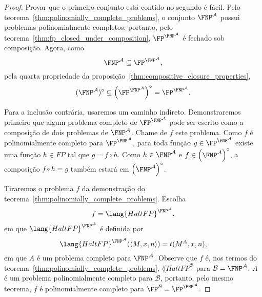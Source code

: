 \begin{proof}
    Provar que o primeiro conjunto está contido no segundo é fácil.
    Pelo teorema~\ref{thm:polinomially_complete_problems},
    o conjunto $\FNP^\mathcal A$
    possui problemas polinomialmente completos;
    portanto,
    pelo teorema~\ref{thm:fp_closed_under_composition},
    $\FP^{\FNP^\mathcal A}$ é fechado sob composição.
    Agora, como
    \begin{equation*}
        \FNP^\mathcal A \subseteq \FP^{\FNP^\mathcal A},
    \end{equation*}
    pela quarta propriedade da proposição~\ref{thm:compositive_closure_properties},
    \begin{equation*}
        (\FNP^\mathcal A)^\circ \subseteq
            \left(\FP^{\FNP^\mathcal A}\right)^\circ
            = \FP^{\FNP^\mathcal A}.
    \end{equation*}

    Para a inclusão contrária,
    usaremos um caminho indireto.
    Demonstraremos primeiro que algum problema completo de
    $\FP^{\FNP^\mathcal A}$
    pode ser escrito como a composição de dois problemas de $\FNP^\mathcal A$.
    Chame de $f$ este problema.
    Como $f$ é polinomialmente completo para $\FP^{\FNP^\mathcal A}$,
    para toda função $g \in \FP^{\FNP^\mathcal A}$ existe uma função $h \in FP$
    tal que $g = f \circ h$.
    Como $h \in \FNP^\mathcal A$ e $f \in \left(\FNP^\mathcal A\right)^\circ$,
    a composição $f \circ h = g$
    também estará em $\left(\FNP^\mathcal A\right)^\circ$.

    Tiraremos o problema $f$
    da demonstração do teorema~\ref{thm:polinomially_complete_problems}.
    Escolha
    \newcommand{\HaltFP}{{\lang{HaltFP}}}
    \begin{equation*}
        f = \HaltFP^{\FNP^\mathcal A},
    \end{equation*}
    em que $\HaltFP^{\FNP^\mathcal A}$ é definida por
    \begin{equation*}
        \HaltFP^{\FNP^\mathcal A}(\langle M, x, n \rangle) = t(M^A, x, n),
    \end{equation*}
    em que $A$ é um problema completo para $\FNP^\mathcal A$.
    Observe que $f$ é,
    nos termos do teorema~\ref{thm:polinomially_complete_problems},
    $\HaltFP^\mathcal B$
    para $\mathcal B = \FNP^\mathcal A$.
    $A$ é um problema polinomialmente completo para $\mathcal B$,
    portanto,
    pelo mesmo teorema,
    $f$ é polinomialmente completo para $\FP^\mathcal B = \FP^{\FNP^\mathcal A}$.


\end{proof}
